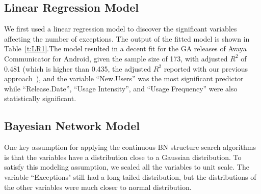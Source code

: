 \documentclass[smallextended]{svjour3}       %
\begin{document}
\subsection{Linear Regression Model}
We first used a linear regression model to discover the significant variables affecting the number of exceptions. The  output  of the fitted model is shown in Table~\ref{t:LR1}.The model resulted in a decent fit for the GA releases of Avaya Communicator for Android, given the sample size of 173, with adjusted $R^2$ of 0.481 (which is higher than  0.435, the adjusted $R^2$  reported with our previous approach~\cite{dey2018modeling}), and the variable ``New.Users'' was the most significant predictor while ``Release.Date'', ``Usage Intensity'', and ``Usage Frequency'' were also statistically significant. 

\begin{table}[ht]
\caption{Summary Result of LR model for ``Exceptions"}\label{t:LR1}
\centering
{}
\end{table}


\subsection{Bayesian Network Model}
One key assumption for applying the continuous BN structure search algorithms 
is that the variables have a distribution close to a Gaussian distribution.
To satisfy this modeling assumption, we scaled all the
variables to unit scale. The variable ``Exceptions" still had a long
tailed distribution, but the distributions of the other variables
were much closer to normal distribution.
\end{document}
